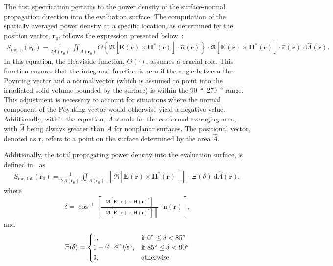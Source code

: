 The first specification pertains to the power density of the surface-normal propagation direction into the evaluation surface.
The computation of the spatially averaged power density at a specific location, as determined by the position vector, $\mathbf{r}_0$, follows the expression presented below~\cite{IEC63195-2-2022}:
\begin{align}
    \label{eqn:propagation-direction}
    S_\text{inc, n}(\mathbf{r}_0) = \frac{1}{2 \hat{A}\left( \mathbf{r}_0 \right)} \; \iint_{A \left( \mathbf{r}_0 \right)} \Theta \left\{ \Re \left[ \mathbf{E \left( r \right)} \times \mathbf{H^* \left( r \right)} \right] \cdot \mathbf{\hat{n} \left( r \right)} \right\} \cdot \Re \left[ \mathbf{E \left( r \right)} \times \mathbf{H^* \left( r \right)} \right] \cdot \mathbf{\hat{n} \left( r \right)} \; \mathrm{d}\hat{A}\left( \mathbf{r} \right).
\end{align}
In this equation, the Heaviside function, $\Theta(\cdot)$, assumes a crucial role.
This function ensures that the integrand function is zero if the angle between the Poynting vector and a normal vector (which is assumed to point into the irradiated solid volume bounded by the surface) is within the \SIrange{90}{270}{\degree} range.
This adjustment is necessary to account for situations where the normal component of the Poynting vector would otherwise yield a negative value.
Additionally, within the equation, $\hat A$ stands for the conformal averaging area, with $\hat A$ being always greater than $A$ for nonplanar surfaces.
The positional vector, denoted as $\mathbf{r}$, refers to a point on the surface determined by the area $\hat A$.

Additionally, the total propagating power density into the evaluation surface, is defined in~\cite{IEC63195-1-2022,IEC63195-2-2022} as
\begin{align}
    \label{eqn:total}
    S_\text{inc, tot}(\mathbf{r}_0) = \frac{1}{2 \hat{A}(\mathbf{r}_0)} \iint_{A(\mathbf{r}_0)} \left\| \Re \left[ \mathbf{E}(\mathbf{r}) \times \mathbf{H}^*(\mathbf{r}) \right] \right\| \cdot \Xi \left( \delta \right) \; \mathrm{d}\hat{A}(\mathbf{r}),
\end{align}
where
\begin{align}
    \delta = \cos^{-1}\left[ {\frac{\Re \left[ \mathbf{E}(\mathbf{r}) \times \mathbf{H}(\mathbf{r})^* \right]}{\left\| \Re \left[ \mathbf{E}(\mathbf{r}) \times \mathbf{H}(\mathbf{r})^* \right] \right\|} \cdot \mathbf{n}(\mathbf{r})} \right],
\end{align}
and
\begin{align}
\Xi(\delta) = \begin{cases}
        1, & \text{if } \SI{0}{\degree} \leq \delta < \SI{85}{\degree} \\
        1 - \nicefrac{(\delta - \SI{85}{\degree})}{\SI{5}{\degree}}, & \text{if } \SI{85}{\degree} \leq \delta < \SI{90}{\degree} \\
        0, & \text{otherwise}.
    \end{cases}
\end{align}

